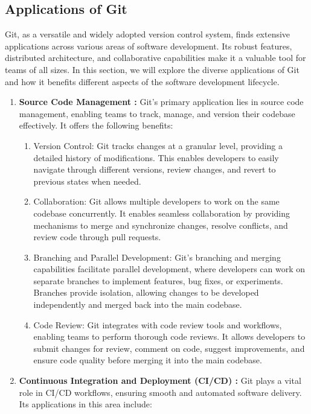 \subsection*{Applications of Git}
Git, as a versatile and widely adopted version control system, finds extensive applications across various areas of software development. Its robust features, distributed architecture, and collaborative capabilities make it a valuable tool for teams of all sizes. In this section, we will explore the diverse applications of Git and how it benefits different aspects of the software development lifecycle.

\begin{enumerate}
    \item \textbf{Source Code Management : }Git's primary application lies in source code management, enabling teams to track, manage, and version their codebase effectively. It offers the following benefits:
    \begin{enumerate}
        \item Version Control: Git tracks changes at a granular level, providing a detailed history of modifications. This enables developers to easily navigate through different versions, review changes, and revert to previous states when needed.
        \item Collaboration: Git allows multiple developers to work on the same codebase concurrently. It enables seamless collaboration by providing mechanisms to merge and synchronize changes, resolve conflicts, and review code through pull requests.
        \item Branching and Parallel Development: Git's branching and merging capabilities facilitate parallel development, where developers can work on separate branches to implement features, bug fixes, or experiments. Branches provide isolation, allowing changes to be developed independently and merged back into the main codebase.
        \item Code Review: Git integrates with code review tools and workflows, enabling teams to perform thorough code reviews. It allows developers to submit changes for review, comment on code, suggest improvements, and ensure code quality before merging it into the main codebase.
    \end{enumerate}
    \item \textbf{Continuous Integration and Deployment (CI/CD) : }Git plays a vital role in CI/CD workflows, ensuring smooth and automated software delivery. Its applications in this area include:
    \begin{enumerate}

\end{enumerate}
\end{enumerate}
